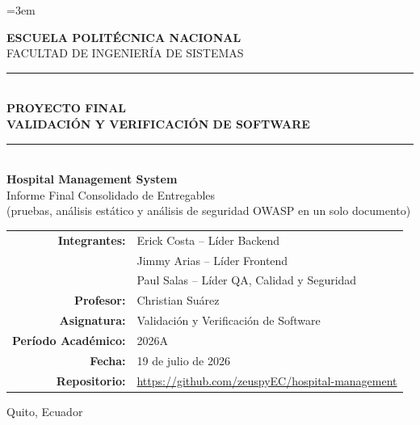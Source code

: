 \documentclass[11pt,a4paper]{article}
\begin{document}
\sloppy
\emergencystretch=3em

\begin{titlepage}
\centering
\vspace*{1cm}

{\Large \textbf{ESCUELA POLIT\'ECNICA NACIONAL}}\\[0.3cm]
{\large FACULTAD DE INGENIER\'IA DE SISTEMAS}\\[1.5cm]

\rule{\linewidth}{0.5pt}\\[0.4cm]
{\Large \textbf{PROYECTO FINAL}}\\[0.2cm]
{\Large \textbf{VALIDACI\'ON Y VERIFICACI\'ON DE SOFTWARE}}\\[0.4cm]
\rule{\linewidth}{0.5pt}\\[1.2cm]

{\huge \textbf{Hospital Management System}}\\[0.3cm]
{\large Informe Final Consolidado de Entregables}\\[0.2cm]
{\small (pruebas, an\'alisis est\'atico y an\'alisis de seguridad OWASP en un solo documento)}\\[2cm]

\begin{tabular}{rl}
\textbf{Integrantes:} & Erick Costa -- L\'ider Backend \\
                       & Jimmy Arias -- L\'ider Frontend \\
                       & Paul Salas -- L\'ider QA, Calidad y Seguridad \\[0.4cm]
\textbf{Profesor:}    & Christian Su\'arez \\[0.4cm]
\textbf{Asignatura:}  & Validaci\'on y Verificaci\'on de Software \\[0.4cm]
\textbf{Per\'iodo Acad\'emico:} & 2026A \\[0.4cm]
\textbf{Fecha:}       & 19 de julio de 2026 \\[0.4cm]
\textbf{Repositorio:} & \url{https://github.com/zeuspyEC/hospital-management}
\end{tabular}

\vfill
{\small Quito, Ecuador}
\end{titlepage}

\thispagestyle{fancy}
\tableofcontents
\newpage

\end{document}
